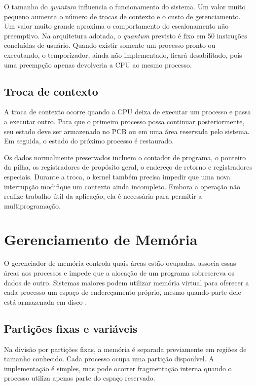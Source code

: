 \documentclass[
    12pt,
    openright,
    a4paper,
    english,
    brazilian
]{abntex2}
\begin{document}
O tamanho do \emph{quantum} influencia o funcionamento do sistema. Um valor muito pequeno aumenta o número de trocas de contexto e o custo de gerenciamento. Um valor muito grande aproxima o comportamento do escalonamento não preemptivo. Na arquitetura adotada, o \emph{quantum} previsto é fixo em 50 instruções concluídas de usuário. Quando existir somente um processo pronto ou executando, o temporizador, ainda não implementado, ficará desabilitado, pois uma preempção apenas devolveria a CPU ao mesmo processo.

\subsection{Troca de contexto}

A troca de contexto ocorre quando a CPU deixa de executar um processo e passa a executar outro. Para que o primeiro processo possa continuar posteriormente, seu estado deve ser armazenado no PCB ou em uma área reservada pelo sistema. Em seguida, o estado do próximo processo é restaurado.

Os dados normalmente preservados incluem o contador de programa, o ponteiro da pilha, os registradores de propósito geral, o endereço de retorno e registradores especiais. Durante a troca, o kernel também precisa impedir que uma nova interrupção modifique um contexto ainda incompleto. Embora a operação não realize trabalho útil da aplicação, ela é necessária para permitir a multiprogramação.

\section{Gerenciamento de Memória}

O gerenciador de memória controla quais áreas estão ocupadas, associa essas áreas aos processos e impede que a alocação de um programa sobrescreva os dados de outro. Sistemas maiores podem utilizar memória virtual para oferecer a cada processo um espaço de endereçamento próprio, mesmo quando parte dele está armazenada em disco \cite{tanenbaum2016}.

\subsection{Partições fixas e variáveis}

Na divisão por partições fixas, a memória é separada previamente em regiões de tamanho conhecido. Cada processo ocupa uma partição disponível. A implementação é simples, mas pode ocorrer fragmentação interna quando o processo utiliza apenas parte do espaço reservado.
\end{document}
